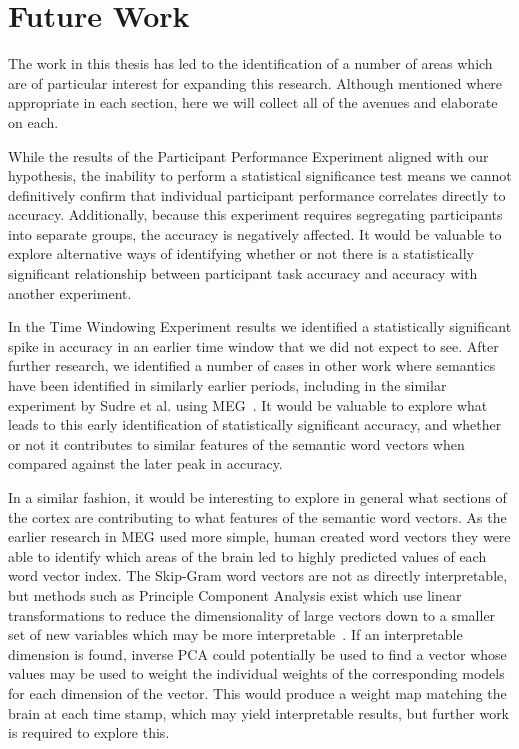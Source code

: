 \section{Future Work}

The work in this thesis has led to the identification of a number of areas 
which are of particular interest for expanding this research. Although 
mentioned where appropriate in each section, here we will collect all of the 
avenues and elaborate on each.

While the results of the Participant Performance Experiment aligned with our 
hypothesis, the inability to perform a statistical significance test means we 
cannot definitively confirm that individual participant performance correlates 
directly to \tvt accuracy. Additionally, because this experiment requires 
segregating participants into separate groups, the \tvt accuracy is negatively 
affected. It would be valuable to explore alternative ways of identifying 
whether or not there is a statistically significant relationship between 
participant task accuracy and \tvt accuracy with another experiment.

In the Time Windowing Experiment results we identified a statistically 
significant spike in \tvt accuracy in an earlier time window that we did not 
expect to see. After further research, we identified a number of cases in other 
work where semantics have been identified in similarly earlier periods, 
including in the similar experiment by Sudre et al. using MEG~\cite{Sudre2012}.
It would be valuable to explore what leads to this early identification of 
statistically significant accuracy, and whether or not it contributes to 
similar features of the semantic word vectors when compared against the later 
peak in accuracy.

In a similar fashion, it would be interesting to explore in general what 
sections of the cortex are contributing to what features of the semantic word 
vectors. As the earlier research in MEG used more simple, human created word 
vectors they were able to identify which areas of the brain led to highly 
predicted values of each word vector index. The Skip-Gram word vectors are not 
as directly interpretable, but methods such as Principle Component Analysis 
exist which use linear transformations to reduce the dimensionality of large 
vectors down to a smaller set of new variables which may be more 
interpretable~\cite{jolliffe2016principal}. If an interpretable dimension is 
found, inverse PCA could potentially be used to find a vector whose values may 
be used to weight the individual weights of the corresponding models for each 
dimension of the vector. This would produce a weight map matching the brain at 
each time stamp, which may yield interpretable results, but further work is 
required to explore this.

